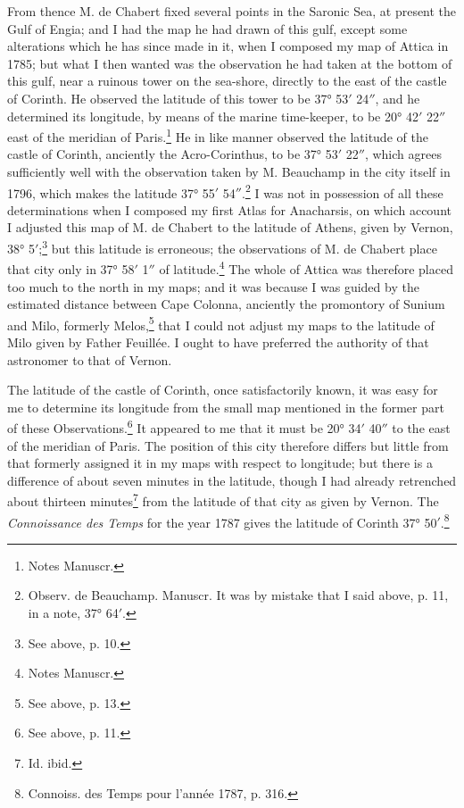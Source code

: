\documentclass[a4paper, 11pt, oneside, polutonikogreek, english]{article}
\begin{document}
From thence M. de Chabert fixed several points in the Saronic Sea, at present the Gulf of Engia; and I had the map he had drawn of this gulf, except some alterations which he has since made in it, when I composed my map of Attica in 1785; but what I then wanted was the observation he had taken at the bottom of this gulf, near a ruinous tower on the sea-shore, directly to the east of the castle of Corinth. He observed the latitude of this tower to be 37° 53$'$ 24$''$, and he determined its longitude, by means of the marine time-keeper, to be 20° 42$'$ 22$''$ east of the meridian of Paris.\footnote{Notes Manuscr.} He in like manner observed the latitude of the castle of Corinth, anciently the Acro-Corinthus, to be 37° 53$'$ 22$''$, which agrees sufficiently well with the observation taken by M. Beauchamp in the city itself in 1796, which makes the latitude 37° 55$'$ 54$''$.\footnote{Observ. de Beauchamp. Manuscr. It was by mistake that I said above, p. 11, in a note, 37° 64$'$.} I was not in possession of all these determinations when I composed my first Atlas for Anacharsis, on which account I adjusted this map of M. de Chabert to the latitude of Athens, given by Vernon, 38° 5$'$;\footnote{See above, p. 10.} but this latitude is erroneous; the observations of M. de Chabert place that city only in 37° 58$'$ 1$''$ of latitude.\footnote{Notes Manuscr.} The whole of Attica was therefore placed too much to the north in my maps; and it was because I was guided by the estimated distance between Cape Colonna, anciently the promontory of Sunium and Milo, formerly Melos,\footnote{See above, p. 13.} that I could not adjust my maps to the latitude of Milo given by Father Feuillée. I ought to have preferred the authority of that astronomer to that of Vernon.

The latitude of the castle of Corinth, once satisfactorily known, it was easy for me to determine its longitude from the small map mentioned in the former part of these Observations.\footnote{See above, p. 11.} It appeared to me that it must be 20° 34$'$ 40$''$ to the east of the meridian of Paris. The position of this city therefore differs but little from that formerly assigned it in my maps with respect to longitude; but there is a difference of about seven minutes in the latitude, though I had already retrenched about thirteen minutes\footnote{Id. ibid.} from the latitude of that city as given by Vernon. The \emph{Connoissance des Temps} for the year 1787 gives the latitude of Corinth 37° 50$'$.\footnote{Connoiss. des Temps pour l'année 1787, p. 316.}
\end{document}
